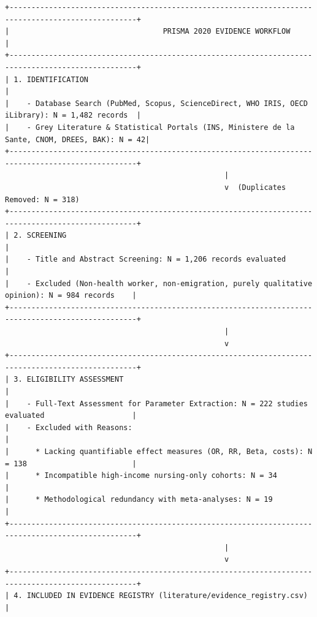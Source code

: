\documentclass[
  11pt,
  a4paper]{article}
\begin{document}
\begin{verbatim}
+---------------------------------------------------------------------------------------------------+
|                                   PRISMA 2020 EVIDENCE WORKFLOW                                   |
+---------------------------------------------------------------------------------------------------+
| 1. IDENTIFICATION                                                                                 |
|    - Database Search (PubMed, Scopus, ScienceDirect, WHO IRIS, OECD iLibrary): N = 1,482 records  |
|    - Grey Literature & Statistical Portals (INS, Ministere de la Sante, CNOM, DREES, BAK): N = 42|
+---------------------------------------------------------------------------------------------------+
                                                  |
                                                  v  (Duplicates Removed: N = 318)
+---------------------------------------------------------------------------------------------------+
| 2. SCREENING                                                                                      |
|    - Title and Abstract Screening: N = 1,206 records evaluated                                    |
|    - Excluded (Non-health worker, non-emigration, purely qualitative opinion): N = 984 records    |
+---------------------------------------------------------------------------------------------------+
                                                  |
                                                  v
+---------------------------------------------------------------------------------------------------+
| 3. ELIGIBILITY ASSESSMENT                                                                         |
|    - Full-Text Assessment for Parameter Extraction: N = 222 studies evaluated                    |
|    - Excluded with Reasons:                                                                       |
|      * Lacking quantifiable effect measures (OR, RR, Beta, costs): N = 138                        |
|      * Incompatible high-income nursing-only cohorts: N = 34                                       |
|      * Methodological redundancy with meta-analyses: N = 19                                       |
+---------------------------------------------------------------------------------------------------+
                                                  |
                                                  v
+---------------------------------------------------------------------------------------------------+
| 4. INCLUDED IN EVIDENCE REGISTRY (literature/evidence_registry.csv)                               |

\end{verbatim}
\end{document}
